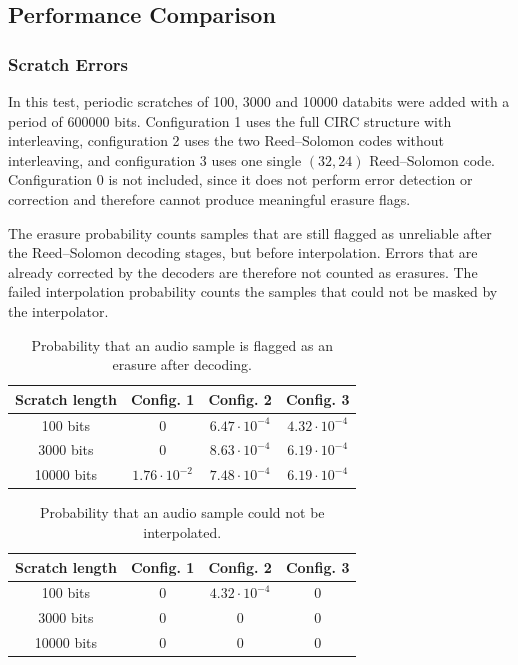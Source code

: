 \documentclass[11pt,a4paper]{article}
\begin{document}
\subsection{Performance Comparison}

\subsubsection{Scratch Errors}

In this test, periodic scratches of 100, 3000 and 10000 databits were added with a period of 600000 bits. Configuration 1 uses the full CIRC structure with interleaving, configuration 2 uses the two Reed--Solomon codes without interleaving, and configuration 3 uses one single $(32,24)$ Reed--Solomon code. Configuration 0 is not included, since it does not perform error detection or correction and therefore cannot produce meaningful erasure flags.

The erasure probability counts samples that are still flagged as unreliable after the Reed--Solomon decoding stages, but before interpolation. Errors that are already corrected by the decoders are therefore not counted as erasures. The failed interpolation probability counts the samples that could not be masked by the interpolator.

\begin{table}[H]
\centering
\begin{tabular}{c|c|c|c}
\hline
Scratch length & Config. 1 & Config. 2 & Config. 3 \\
\hline
100 bits   & $0$ & $6.47\cdot 10^{-4}$ & $4.32\cdot 10^{-4}$ \\
3000 bits  & $0$ & $8.63\cdot 10^{-4}$ & $6.19\cdot 10^{-4}$ \\
10000 bits & $1.76\cdot 10^{-2}$ & $7.48\cdot 10^{-4}$ & $6.19\cdot 10^{-4}$ \\
\hline
\end{tabular}
\caption{Probability that an audio sample is flagged as an erasure after decoding.}
\label{tab:scratch_erasure}
\end{table}

\begin{table}[H]
\centering
\begin{tabular}{c|c|c|c}
\hline
Scratch length & Config. 1 & Config. 2 & Config. 3 \\
\hline
100 bits   & $0$ & $4.32\cdot 10^{-4}$ & $0$ \\
3000 bits  & $0$ & $0$ & $0$ \\
10000 bits & $0$ & $0$ & $0$ \\
\hline
\end{tabular}
\caption{Probability that an audio sample could not be interpolated.}
\label{tab:scratch_interpolation}
\end{table}
\end{document}
